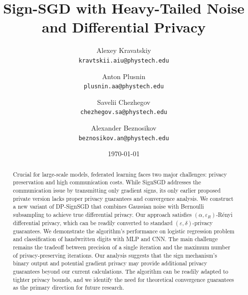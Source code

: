 \documentclass[12pt]{article}
\title{Sign-SGD with Heavy-Tailed Noise and Differential Privacy}
\author{
  Alexey Kravatskiy\\
  \texttt{kravtskii.aiu@phystech.edu}
  \and
  Anton Plusnin\\
  \texttt{plusnin.aa@phystech.edu}
  \and
  Savelii Chezhegov\\
  \texttt{chezhegov.sa@phystech.edu}
  \and
  Alexander Beznosikov\\
  \texttt{beznosikov.an@phystech.edu}
}
\date{\today}
\begin{document}
\maketitle

\begin{abstract}

Crucial for large-scale models, federated learning faces two major challenges: privacy preservation and high communication costs. While SignSGD addresses the communication issue by transmitting only gradient signs, its only earlier proposed private version lacks proper privacy guarantees and convergence analysis. We construct a new variant of DP-SignSGD that combines Gaussian noise with Bernoulli subsampling to achieve true differential privacy. Our approach satisfies $(\alpha, \varepsilon_R)$-Rényi differential privacy, which can be readily converted to standard $(\varepsilon, \delta)$-privacy guarantees. We demonstrate the algorithm's performance on logistic regression problem and classification of handwritten digits with MLP and CNN. The main challenge remains the tradeoff between precision of a single iteration and the maximum number of privacy-preserving iterations. Our analysis suggests that the sign mechanism's binary output and potential gradient privacy may provide additional privacy guarantees beyond our current calculations. The algorithm can be readily adapted to tighter privacy bounds, and we identify the need for theoretical convergence guarantees as the primary direction for future research.
\end{abstract}
\end{document}
